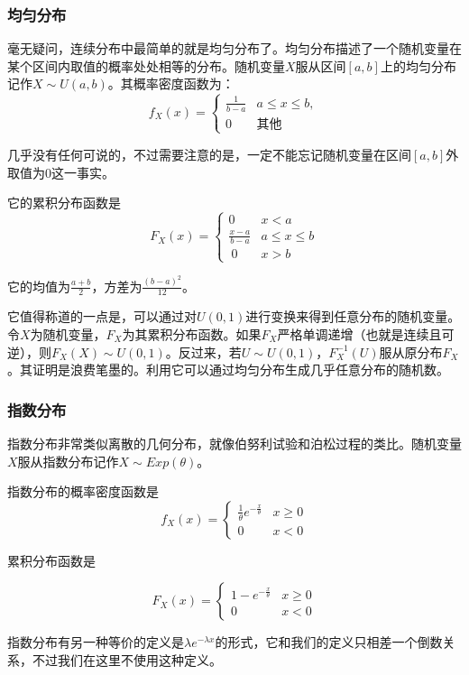 \subsubsection{均匀分布}
毫无疑问，连续分布中最简单的就是均匀分布了。均匀分布描述了一个随机变量在某个区间内取值的概率处处相等的分布。随机变量$X$服从区间$[a,b]$上的均匀分布记作$X\sim U(a,b)$。其概率密度函数为：
\[
f_X(x) = \begin{cases}
    \frac1{b-a} & a\leq x\leq b,\\
    0 & 其他
\end{cases}
\]

几乎没有任何可说的，不过需要注意的是，一定不能忘记随机变量在区间$[a,b]$外取值为$0$这一事实。

它的累积分布函数是
\[
F_X(x) = \begin{cases}
    0 & x < a\\
    \frac{x-a}{b-a} & a\leq x \leq b\\\
    0 & x> b
\end{cases}
\]

它的均值为$\frac{a+b}{2}$，方差为$\frac{(b-a)^2}{12}$。

它值得称道的一点是，可以通过对$U(0,1)$进行变换来得到任意分布的随机变量。令$X$为随机变量，$F_X$为其累积分布函数。如果$F_X$严格单调递增（也就是连续且可逆），则$F_X(X)\sim U(0,1)$。反过来，若$U\sim U(0,1)$，$F_X^{-1}(U)$服从原分布$F_X$。其证明是浪费笔墨的。利用它可以通过均匀分布生成几乎任意分布的随机数。

\subsubsection{指数分布}
指数分布非常类似离散的几何分布，就像伯努利试验和泊松过程的类比。随机变量$X$服从指数分布记作$X\sim Exp(\theta)$。

指数分布的概率密度函数是
\[
f_X(x) = \begin{cases}
    \frac 1\theta e^{-\frac x\theta} & x \geq 0\\
    0 & x < 0
\end{cases}
\]

累积分布函数是

\[
F_X(x) = \begin{cases}
    1-e^{-\frac x\theta} & x \geq 0\\
    0 & x < 0
\end{cases}
\]

\begin{attention}
指数分布有另一种等价的定义是$\lambda e^{-\lambda x}$的形式，它和我们的定义只相差一个倒数关系，不过我们在这里不使用这种定义。
\end{attention}

